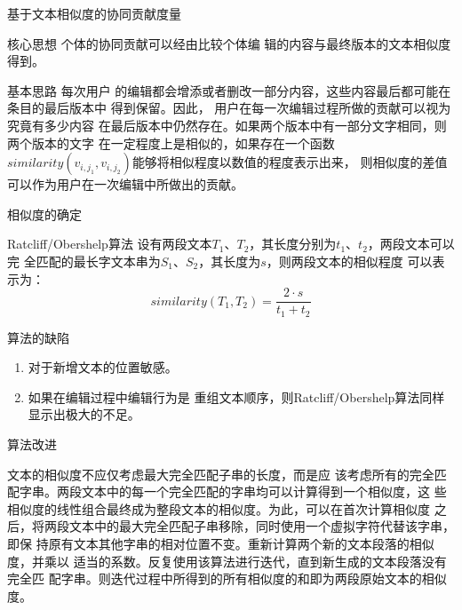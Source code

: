 \documentclass[slidestop,compress,mathserif,table]{beamer}
\begin{document}
\begin{frame}{基于文本相似度的协同贡献度量}
  \begin{block}{核心思想}
    个体的协同贡献可以经由比较个体编
辑的内容与最终版本的文本相似度得到。
  \end{block}
\vfill
\begin{block}{基本思路}
  每次用户
的编辑都会增添或者删改一部分内容，这些内容最后都可能在条目的最后版本中
得到保留。因此， 用户在每一次编辑过程所做的贡献可以视为究竟有多少内容
在最后版本中仍然存在。如果两个版本中有一部分文字相同，则两个版本的文字
在一定程度上是相似的，如果存在一个函数
$similarity(v_{i,j_1},v_{i,j_2})$能够将相似程度以数值的程度表示出来，
则相似度的差值可以作为用户在一次编辑中所做出的贡献。
\end{block}
    \end{frame}

    \begin{frame}{相似度的确定}
      \begin{exampleblock}{Ratcliff/Obershelp算法}
         设有两段文本$T_1$、$T_2$，其长度分别为$t_1$、$t_2$，两段文本可以完
全匹配的最长字文本串为$S_1$、$S_2$，其长度为$s$，则两段文本的相似程度
可以表示为：
\[
similarity(T_1,T_2)=\frac{2 \cdot  s}{t_1+t_2}
\]
        
      \end{exampleblock}

\pause
\begin{block}{算法的缺陷}

  \begin{enumerate}
  \item 对于新增文本的位置敏感。
\item 如果在编辑过程中编辑行为是
重组文本顺序，则Ratcliff/Obershelp算法同样显示出极大的不足。
  \end{enumerate}
  
\end{block}
    \end{frame}

    \begin{frame}{算法改进}
    

文本的相似度不应仅考虑最大完全匹配子串的长度，而是应
该考虑所有的完全匹配字串。两段文本中的每一个完全匹配的字串均可以计算得到一个相似度，这
些相似度的线性组合最终成为整段文本的相似度。为此，可以在首次计算相似度
之后，将两段文本中的最大完全匹配子串移除，同时使用一个虚拟字符代替该字串，即保
持原有文本其他字串的相对位置不变。重新计算两个新的文本段落的相似度，并乘以
适当的系数。反复使用该算法进行迭代，直到新生成的文本段落没有完全匹
配字串。则迭代过程中所得到的所有相似度的和即为两段原始文本的相似度。

    \end{frame}
\end{document}
